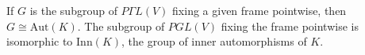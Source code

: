 If $G$ is the subgroup of $P\Gamma L(V)$ fixing a given frame pointwise, then $G \cong \mathrm{Aut}(K)$. The subgroup of $PGL(V)$ fixing the frame pointwise is isomorphic to $\mathrm{Inn}(K)$, the group of inner automorphisms of $K$.
